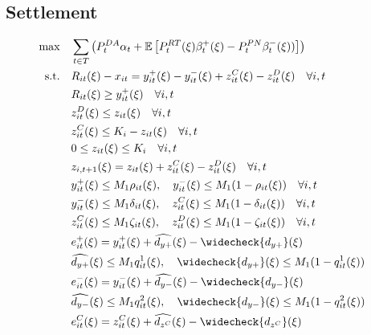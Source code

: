 \documentclass[10pt]{article}
\begin{document}
\subsection{Settlement}
\begin{subequations}
    \begin{align*}
    \text{max} \quad &\sum_{t\in T}\left(P_t^{DA}\alpha_t + \mathbb{E}\left[P_t^{RT}(\xi)\beta_{t}^{+}(\xi) - P_t^{PN}\beta_{t}^{-}(\xi))\right]\right)&\\   
    \text{s.t.} \quad &R_{it}(\xi) - x_{it} = y_{it}^{+}(\xi) - y_{it}^{-}(\xi) + z^C_{it}(\xi) - z^D_{it}(\xi)\quad  \forall i, t &\\ 
    &R_{it}(\xi) \geq y^+_{it}(\xi) \quad \forall i ,t &\\
    &z^D_{it}(\xi) \le z_{it}(\xi) \quad \forall i, t &\\
    &z^C_{it}(\xi) \le K_i-z_{it}(\xi) \quad \forall i, t &\\
    &0 \leq z_{it}(\xi) \leq K_i \quad \forall i, t &\\
    &z_{i,t+1}(\xi) = z_{it}(\xi) + z^C_{it}(\xi) - z^D_{it}(\xi) \quad \forall i, t &\\
    &y^+_{it}(\xi) \leq M_1 \rho_{it}(\xi), \quad y^-_{it}(\xi) \leq M_1 (1 - \rho_{it}(\xi)) \quad \forall i, t &\\
    &y^-_{it}(\xi) \leq M_1 \delta_{it}(\xi), \quad z^C_{it}(\xi) \leq M_1 (1 - \delta_{it}(\xi)) \quad \forall i, t &\\
    &z^C_{it}(\xi) \leq M_1 \zeta_{it}(\xi), \quad z^D_{it}(\xi) \leq M_1 (1 - \zeta_{it}(\xi)) \quad \forall i, t &\\
    &e^+_{it}(\xi) = y^+_{it}(\xi) + \widehat{d_{y+}}(\xi) - \widecheck{d_{y+}}(\xi) &\\
    &\widehat{d_{y+}}(\xi) \leq M_1 q^1_{it}(\xi), \quad \widecheck{d_{y+}}(\xi) \leq M_1 (1 - q^1_{it}(\xi)) &\\
    &e^-_{it}(\xi) = y^-_{it}(\xi) + \widehat{d_{y-}}(\xi) - \widecheck{d_{y-}}(\xi) &\\
    &\widehat{d_{y-}}(\xi) \leq M_1 q^2_{it}(\xi), \quad \widecheck{d_{y-}}(\xi) \leq M_1 (1 - q^2_{it}(\xi)) &\\
    &e^C_{it}(\xi) = z^C_{it}(\xi) + \widehat{d_{z^C}}(\xi) - \widecheck{d_{z^C}}(\xi) &\\

\end{align*}
\end{subequations}
\end{document}
